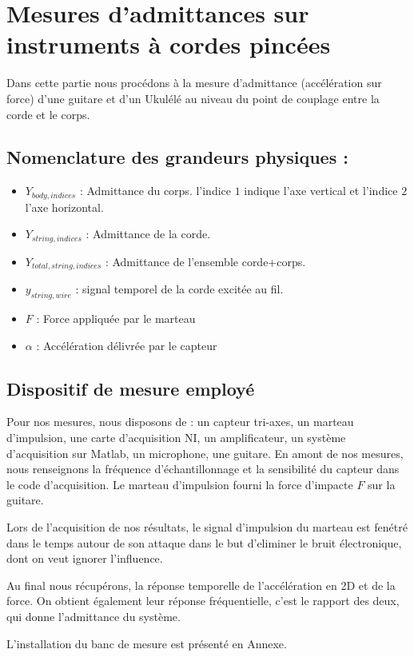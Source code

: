 \chapter{Mesures d'admittances sur instruments à cordes pincées}
Dans cette partie nous procédons à la mesure d'admittance (accélération sur force) d'une guitare et d'un Ukulélé au niveau du point de couplage entre la corde et le corps.
\section{Nomenclature des grandeurs physiques :} 
\begin{itemize}
\item $Y_{body,indices}$ : Admittance du corps. l'indice $1$ indique l'axe vertical et l'indice $2$ l'axe horizontal.
\item $Y_{string,indices}$ : Admittance de la corde.
\item $Y_{total,string,indices}$ : Admittance de l'ensemble corde+corps.
\item $y_{string,wire}$ : signal temporel de la corde excitée au fil.
\item $F$ : Force appliquée par le marteau 
\item $\alpha$ : Accélération délivrée par le capteur 
\end{itemize}

\section{Dispositif de mesure employé}
Pour nos mesures, nous disposons de : un capteur tri-axes,
un marteau d'impulsion, une carte d'acquisition NI, un amplificateur,
un système d'acquisition sur Matlab, un microphone, une guitare.
En amont de nos mesures, nous renseignons la fréquence d'échantillonnage et la sensibilité du capteur dans le code d'acquisition. Le marteau d'impulsion fourni la force d'impacte $F$ sur la guitare. 

Lors de l'acquisition de nos résultats, le signal d'impulsion du marteau est fenétré dans le temps autour de son attaque dans le but d'eliminer le bruit électronique, dont on veut ignorer l'influence. 

Au final nous récupérons, la réponse temporelle de l'accélération en 2D et de la force. On obtient également leur réponse fréquentielle, c'est le rapport des deux, qui donne l'admittance du système.

L'installation du banc de mesure est présenté en Annexe. %


